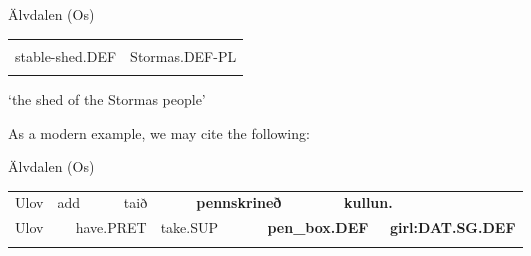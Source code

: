 \begin{listWWNumileveli}
\item {}

\begin{styleExample}
Älvdalen (Os)

\end{styleExample}

\end{listWWNumileveli}

\begin{tabular}{ll}
\lsptoprule
\multicolumn{2}{l}{fjosbuðę

}\\
stable-shed.DEF & Stormas.DEF-PL\\
\lspbottomrule
\end{tabular}

\begin{styleTranslation}
‘the shed of the Stormas people’

\end{styleTranslation}

\begin{styleBodyTextFirst}
As a modern example, we may cite the following:

\end{styleBodyTextFirst}

\begin{listWWNumileveli}
\item {}

\begin{styleExample}
Älvdalen (Os)

\end{styleExample}

\end{listWWNumileveli}

\begin{tabular}{llllllllll}
\lsptoprule
Ulov & \multicolumn{2}{l}{add

} & \multicolumn{2}{l}{taið

} & \multicolumn{2}{l}{{\bfseries pennskrineð}

} & \multicolumn{2}{l}{{\bfseries kullun.}

} & \\
\multicolumn{2}{l}{Ulov

} & \multicolumn{2}{l}{have.PRET

} & \multicolumn{2}{l}{take.SUP

} & \multicolumn{2}{l}{{\bfseries pen\_box.DEF}

} & \multicolumn{2}{l}{{\bfseries girl:DAT.SG.DEF}

}\\
\lspbottomrule
\end{tabular}


